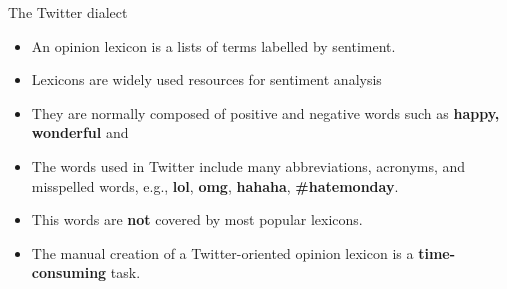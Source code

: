 
\begin{frame}{The Twitter dialect}
\begin{scriptsize}
\begin{itemize}
\item An opinion lexicon is a lists of terms labelled by sentiment.
\item Lexicons are widely used resources for sentiment analysis
\item They are normally composed of positive and negative words such as \textcolor[rgb]{0.00,0.00,1.00}{\textbf{happy, wonderful}} and 
 \item The words used in Twitter include many abbreviations, acronyms, and misspelled words, e.g., \textbf{lol}, \textbf{omg}, \textbf{hahaha}, \textbf{\#hatemonday}.
\item This words are \textbf{not} covered by most popular lexicons.
\item The manual creation of a Twitter-oriented opinion lexicon is a \textbf{time-consuming} task.
\end{itemize}
\end{scriptsize}
\end{frame}



